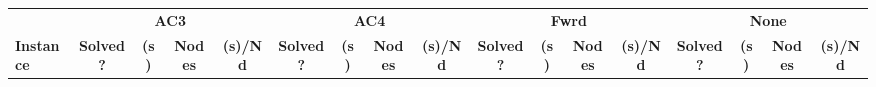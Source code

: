 \documentclass[main.tex]{subfiles}
\begin{document}
\thispagestyle{empty}

\begin{landscape}
\begin{center}
\renewcommand{\arraystretch}{1.4} 
\begin{tabular}{l
cccccccccccccccc}
	\hline
 & \multicolumn{4}{c}{\textbf{AC3}} & \multicolumn{4}{c}{\textbf{AC4}} & \multicolumn{4}{c}{\textbf{Fwrd}} & \multicolumn{4}{c}{\textbf{None}}\\
\textbf{Instance}  & \textbf{Solved ?} & \textbf{(s)} & \textbf{Nodes} & \textbf{(s)/Nd} & \textbf{Solved ?} & \textbf{(s)} & \textbf{Nodes} & \textbf{(s)/Nd} & \textbf{Solved ?} & \textbf{(s)} & \textbf{Nodes} & \textbf{(s)/Nd} & \textbf{Solved ?} & \textbf{(s)} & \textbf{Nodes} & \textbf{(s)/Nd}\\\hline


\end{tabular}
\end{center}
\end{landscape}
\end{document}
